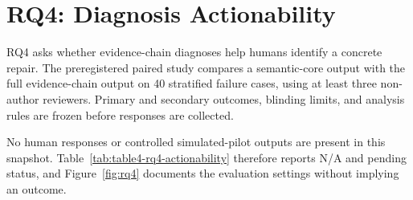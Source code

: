 \section{RQ4: Diagnosis Actionability}
RQ4 asks whether evidence-chain diagnoses help humans identify a concrete
repair. The preregistered paired study compares a semantic-core output with the
full evidence-chain output on 40 stratified failure cases, using at least three
non-author reviewers. Primary and secondary outcomes, blinding limits, and
analysis rules are frozen before responses are collected.

No human responses or controlled simulated-pilot outputs are present in this
snapshot. Table~\ref{tab:table4-rq4-actionability} therefore reports N/A and pending status, and
Figure~\ref{fig:rq4} documents the evaluation settings without implying an
outcome.



